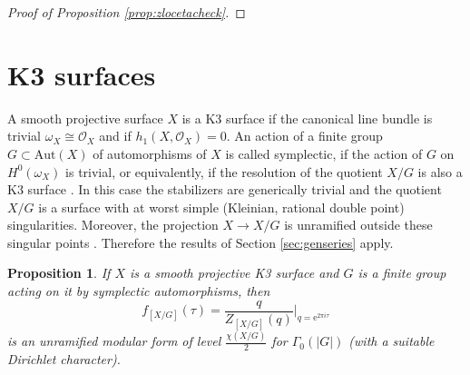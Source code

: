 \documentclass[11pt,a4paper]{amsart}
\newtheorem{proposition}[theorem]{Proposition}
\theoremstyle{definition}
\newcommand{\SZ}{\mathbb{Z}}                    %
\newcommand{\CO}{\mathcal{O}}                    %
\begin{document}
\begin{proof}[{Proof of Proposition \ref{prop:zlocetacheck}}]
\begin{comment}
By Lemma \ref{lem:locmod} the series $1/Z_{D_4}(\tau)$, resp.  $1/Z_{D_5}(\tau)$, resp.  $1/Z_{D_6}(\tau)$, resp. $1/Z_{E_6}(\tau)$ is a holomorphic  modular forms of weight $1/2$ for the principal congruence subgroup $\Gamma(16)$, resp. $\Gamma(96)$, resp. $\Gamma(64)$, resp. $\Gamma(72)$.

For $k \in 1/2\SZ$ let $\mathcal{M}_{k}(\Gamma_1(4N))$ be the space of a holomorphic  modular forms of weight $k$ for $\Gamma_1(4N)$. Let $\theta(\tau)=\sum_{n=-\infty}^{\infty} mathrm{e}^{2 \pi i n^2 \tau}$ be the Jacobi theta function. It is a holomorphic  modular forms of weight $1/2$ for $\Gamma_1(4)$. The multiplication by $\theta^3$ induces an embedding
\[ \mathcal{M}_{1/2}(\Gamma_1(4N)) \hookrightarrow \mathcal{M}_{2}(\Gamma_1(4N)). \]
\[ \mathrm{dim}\mathcal{M}_{2}(\Gamma_1(4N))=\frac{d_N}{12N}+ \frac{1}{4}\sum_{d \mid N}\phi(d)\phi\left(\frac{N}{d}\right),\]
where
\[  \]

\end{comment}

\end{proof}





\section{K3 surfaces}
\label{sec:k3surf}

A smooth projective surface $X$ is a K3 surface if the canonical line bundle is trivial $\omega_X \cong \CO_X$ and if $h_1(X,\CO_X)=0$. An action of a finite group $G \subset \mathrm{Aut}(X)$ of automorphisms of $X$ is called symplectic, if the action of $G$ on $H^0(\omega_X)$ is trivial, or equivalently, if the resolution of the quotient $X/G$ is also a K3 surface \cite[Page 1]{xiao1996galois}. In this case the stabilizers are generically trivial and the quotient $X/G$ is a surface with at worst simple (Kleinian, rational double point) singularities. Moreover, the projection $ X \to X/G$ is unramified outside these singular points \cite{mukai1988finite}. Therefore the results of Section \ref{sec:genseries} apply.

\begin{proposition} 
\label{prop:k3mod}
If $X$ is a smooth projective K3 surface and $G$ is a finite group acting on it by symplectic automorphisms, then
\[f_{[X/G]}(\tau)=\frac{q}{Z_{[X/G]}(q)}\Big|_{q=\mathrm{e}^{2 \pi i \tau}}\]
is an unramified modular form of level $\frac{\chi(X/G)}{2}$ for $\Gamma_0(|G|)$ (with a suitable Dirichlet character).
\end{proposition}
\end{document}

